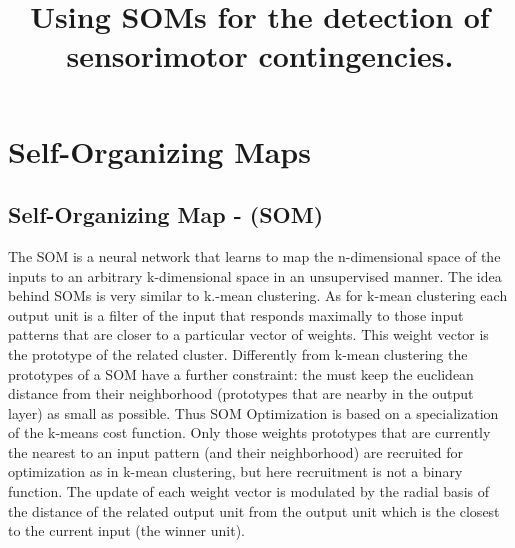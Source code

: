 \documentclass[a4paper]{article}
\title{Using SOMs for the detection of sensorimotor contingencies.}
\author{}
\begin{document}
\maketitle


\section*{Self-Organizing Maps}

\subsection*{Self-Organizing Map - (SOM)}

The SOM is a neural network that learns to map the n-dimensional space of the inputs to an arbitrary k-dimensional space in an unsupervised manner. 
The idea behind SOMs is very similar to k.-mean clustering. As for k-mean clustering each output unit is a filter of the input that responds maximally to those input patterns that are closer to a particular vector of weights. This weight vector is the prototype of the related cluster. Differently from k-mean clustering the prototypes of a SOM have a further constraint: the must keep the euclidean distance from their neighborhood (prototypes that are nearby in the output layer) as small as possible.
Thus SOM Optimization is based on a specialization of the k-means cost function. Only those weights prototypes that are currently the nearest to an input pattern (and their neighborhood) are recruited for optimization as in k-mean clustering,  but here recruitment is not a binary function. The update of each weight vector is modulated by the radial basis of the distance of the related output unit from the output unit which is the closest to the current input (the winner unit).   
\end{document}
